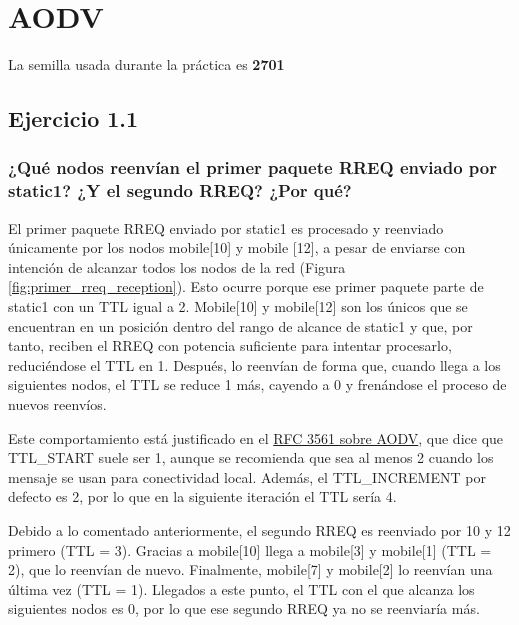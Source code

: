 \chapter{AODV}
\label{chap:aodv}

\vspace{-0.5cm}
\tcolorbox[colback=yellow!20, colframe=yellow!75!black, title=Nota]
La semilla usada durante la práctica es \textbf{2701}
\endtcolorbox
\vspace{1cm}

\section{Ejercicio 1.1}

\subsection{¿Qué nodos reenvían el primer paquete RREQ enviado por static1? ¿Y el segundo RREQ? ¿Por qué?}

El primer paquete RREQ enviado por static1 es procesado y reenviado únicamente por los nodos mobile[10] y mobile [12], a pesar de enviarse con intención de alcanzar todos los nodos de la red (Figura \ref{fig:primer_rreq_reception}). Esto ocurre porque ese primer paquete parte de static1 con un TTL igual a 2. Mobile[10] y mobile[12] son los únicos que se encuentran en un posición dentro del rango de alcance de static1 y que, por tanto, reciben el RREQ con potencia suficiente para intentar procesarlo, reduciéndose el TTL en 1. Después, lo reenvían de forma que, cuando llega a los siguientes nodos, el TTL se reduce 1 más, cayendo a 0 y frenándose el proceso de nuevos reenvíos.

Este comportamiento está justificado en el \href{https://datatracker.ietf.org/doc/html/rfc3561}{RFC 3561 sobre AODV}, que dice que TTL\_START suele ser 1, aunque se recomienda que sea al menos 2 cuando los mensaje se usan para conectividad local. Además, el TTL\_INCREMENT por defecto es 2, por lo que en la siguiente iteración el TTL sería 4.

Debido a lo comentado anteriormente, el segundo RREQ es reenviado por 10 y 12 primero (TTL = 3). Gracias a mobile[10] llega a mobile[3] y mobile[1] (TTL = 2), que lo reenvían de nuevo. Finalmente, mobile[7] y mobile[2] lo reenvían una última vez (TTL = 1). Llegados a este punto, el TTL con el que alcanza los siguientes nodos es 0, por lo que ese segundo RREQ ya no se reenviaría más.

